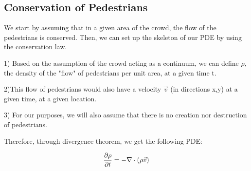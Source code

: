 \documentclass{article}
\begin{document}
\subsection{Conservation of Pedestrians}
We start by assuming that in a given area of the crowd, the flow of the pedestrians is conserved. Then, we can set up the skeleton of our PDE by using the conservation law. 

1) Based on the assumption of the crowd acting as a continuum, we can define $\rho$, the density of the "flow" of pedestrians per unit area, at a given time t.

2)This flow of pedestrians would also have a  velocity $\vec{v}$ (in directions x,y) at a given time, at a given location.

3) For our purposes, we will also assume that there is no creation nor destruction of pedestrians.

Therefore, through divergence theorem, we get the following PDE:

\[
    \diffp \rho t = - \nabla\cdot (\rho\vec v)
\]
\end{document}
